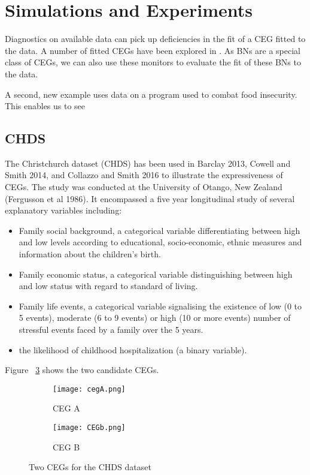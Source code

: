 \documentclass[12pt]{article}
\begin{document}
\section{Simulations and Experiments}

Diagnostics on available data can pick up deficiencies in the fit of a CEG fitted to the data. A number of fitted CEGs have been explored in \cite{CEGbook}. As BNs are a special class of CEGs, we can also use these monitors to evaluate the fit of these BNs to the data. 

A second, new example uses data on a program used to combat food insecurity. This enables us to see 


\subsection{CHDS}

The Christchurch dataset (CHDS) has been used in Barclay 2013, Cowell and Smith 2014, and Collazzo and Smith 2016 to illustrate the expressiveness of CEGs. The study was conducted at the University of Otango, New Zealand (Fergusson et al 1986). It encompassed a five year longitudinal study of several explanatory variables including: 

\begin{itemize}
	\item Family social background, a categorical variable differentiating between high and low levels according to educational, socio-economic, ethnic measures and information about the children’s birth.
	\item Family economic status, a categorical variable distinguishing between high and
	low status with regard to standard of living.
	\item Family life events, a categorical variable signalising the existence of low (0 to 5 events), moderate (6 to 9 events) or high (10 or more events) number of stressful events faced by a family over the 5 years.
	\item the likelihood of childhood hospitalization (a binary variable). 
\end{itemize}

Figure ~\ref{fig:cegs} shows the two candidate CEGs. 

\begin{figure}
\centering
\begin{subfigure}{.5\textwidth}
  \centering
  \texttt{[image: cegA.png]}
  \caption{CEG A}
  \label{fig:CEGa}
\end{subfigure}%
\begin{subfigure}{.5\textwidth}
  \centering
  \texttt{[image: CEGb.png]}
  \caption{CEG B}
  \label{fig:CEGb}
\end{subfigure}
\caption{Two CEGs for the CHDS dataset}
\label{fig:cegs}
\end{figure}
\end{document}
